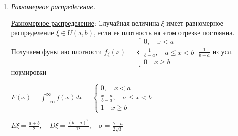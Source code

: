 \documentclass[12pt]{article}
\begin{document}
\begin{enumerate}
    Математическим ожиданием $E\xi$ случайной абсолютно непрерывной величины $\xi$ называется величина $E\xi = \int_{-\infty}^{\infty} xf_\xi(x) dx$ 
    при условии, что данный интеграл сходится абсолютно, то есть $\int_{-\infty}^\infty |x|f_\xi(x)dx < \infty$

    Дисперсией $D\xi$ случайной величины $\xi$ называется величина $D\xi = E(\xi - E\xi)^2 = \int_{-\infty}^\infty (x - E\xi)^2 f_\xi(x) dx$ при условии,
    что данный интеграл сходится. Вычислять удобно по формуле $D\xi = E\xi^2 - (E\xi)^2 = \int_{-\infty}^\infty x^2 f_\xi(x)dx - (E\xi)^2$

    Среднее квадратическое отклонение $\sigma_\xi = \sqrt{D\xi}$ определяется как корень дисперсии

    $m_k = E\xi^k = \int_{-\infty}^\infty x^k f_\xi(x)dx$ - момент $k$-ого порядка

    $\mu_k = E(\xi - E\xi)^k = \int_{-\infty}^\infty (x - E\xi)^k f_\xi(x)dx$ - центральный момент $k$-ого порядка
    
    Медианой $Me$ абсолютно непрерывной случайной величины $\xi$ называется значение случайной величины $\xi$, такое что $p(\xi < Me) = p(\xi > Me) = \frac{1}{2}$
    
    Модой $Mo$ случайной величины $\xi$ называется точка локального максимума плотности

    \item \textit{Равномерное распределение. }

    \hyperlink{uniformdistribution}{Равномерное распределение}: Случайная величина $\xi$ имеет равномерное распределение $\xi \in U(a, b)$, если ее плотность
    на этом отрезке постоянна. Получаем функцию плотности $f_\xi(x) = \begin{cases}0, \quad x < a \\ \frac{1}{b - a}, \quad a \leq x < b \\ 0 \quad x \geq b\end{cases}$ \hfill {\scriptsize $\frac{1}{b - a}$ из усл. нормировки}

    $F(x) = \int_{-\infty}^\infty f(x)dx = \begin{cases}0, \quad x < a \\ \frac{x - a}{b - a}, \quad a \leq x < b \\ 1 \quad x \geq b\end{cases}$

    $E\xi = \frac{a + b}{2}, \quad D\xi = \frac{(b - a)^2}{12}, \quad \sigma = \frac{b - a}{2\sqrt{3}}$


\end{enumerate}
\end{document}

